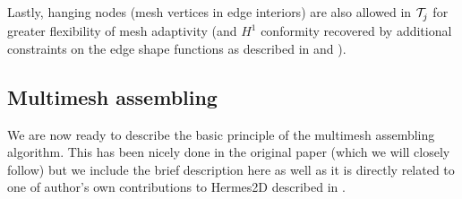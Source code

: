 Lastly, hanging nodes (mesh vertices in edge interiors) are also
allowed in $\mathcal{T}^{}_{j}$ for greater flexibility of mesh adaptivity (and $H^1$ conformity recovered by additional constraints on the edge shape functions as
described in \cite[\S3.6]{Hermes-book1} and \cite{Hermes-hanging-nodes}).

\subsection{Multimesh assembling}
We are now ready to describe the basic principle of the multimesh assembling algorithm. This has been nicely done in 
the original paper \cite{Hermes-thermoelasticity} (which we will closely follow) but we include the brief description
here as well as it is directly related to one of author's own contributions to Hermes2D described in
.

